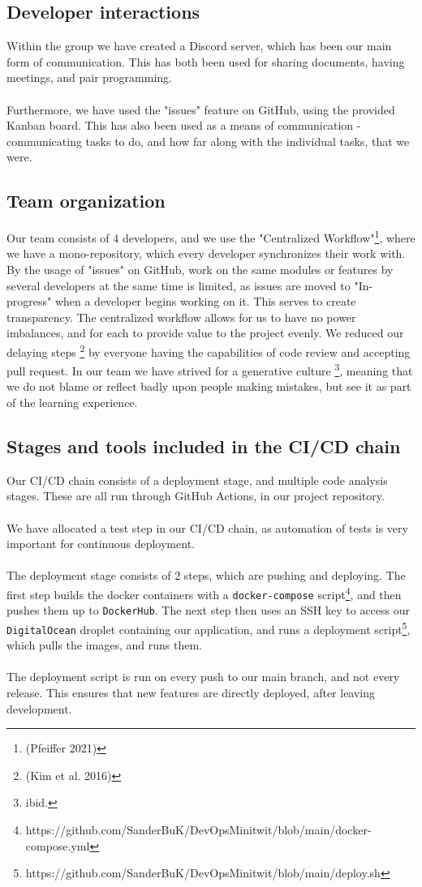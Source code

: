 \documentclass{article}
\begin{document}
\subsection{Developer interactions}
Within the group we have created a Discord server, which has been our main form of communication. This has both been used for sharing documents, having meetings, and pair programming.
\\\\
Furthermore, we have used the "issues" feature on GitHub, using the provided Kanban board. This has also been used as a means of communication - communicating tasks to do, and how far along with the individual tasks, that we were.

\subsection{Team organization}
Our team consists of 4 developers, and we use the "Centralized Workflow"\footnote{(Pfeiffer 2021)}, where we have a mono-repository, which every developer synchronizes their work with. By the usage of "issues" on GitHub, work on the same modules or features by several developers at the same time is limited, as issues are moved to "In-progress" when a developer begins working on it. This serves to create transparency. The centralized workflow allows for us to have no power imbalances, and for each to provide value to the project evenly. We reduced our delaying steps \footnote{(Kim et al. 2016)} by everyone having the capabilities of code review and accepting pull request. In our team we have strived for a generative culture \footnote{ibid.}, meaning that we do not blame or reflect badly upon people making mistakes, but see it as part of the learning experience.

\subsection{Stages and tools included in the CI/CD chain}
Our CI/CD chain consists of a deployment stage, and multiple code analysis stages. These are all run through GitHub Actions, in our project repository.
\\\\
We have allocated a test step in our CI/CD chain, as automation of tests is very important for continuous deployment.
\\\\
The deployment stage consists of 2 steps, which are pushing and deploying. The first step builds the docker containers with a \verb|docker-compose| script\footnote{https://github.com/SanderBuK/DevOpsMinitwit/blob/main/docker-compose.yml}, and then pushes them up to \verb|DockerHub|. The next step then uses an SSH key to access our \verb|DigitalOcean| droplet containing our application, and runs a deployment script\footnote{https://github.com/SanderBuK/DevOpsMinitwit/blob/main/deploy.sh}, which pulls the images, and runs them.
\\\\
The deployment script is run on every push to our main branch, and not every release. This ensures that new features are directly deployed, after leaving development.
\end{document}
